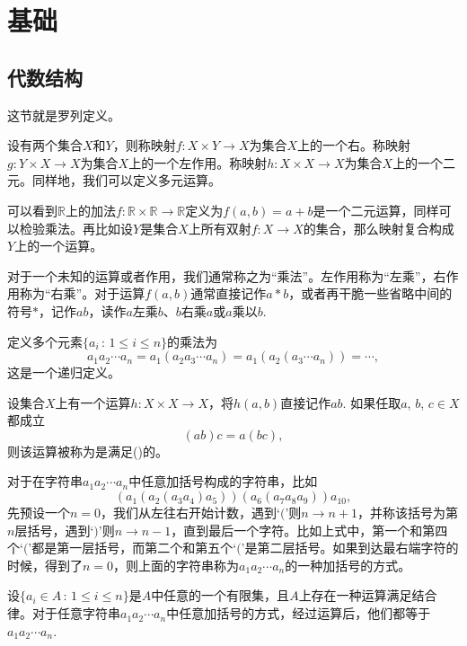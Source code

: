 \chapter{基础}

\section{代数结构}

这节就是罗列定义。

\begin{para}
设有两个集合$X$和$Y$，则称映射$f:X\times Y \to X$为集合$X$上的一个右。称映射$g:Y\times X \to X$为集合$X$上的一个左作用。称映射$h:X\times X \to X$为集合$X$上的一个二元。同样地，我们可以定义多元运算。
\end{para}

可以看到$\mathbb{R}$上的加法$f:\mathbb{R}\times \mathbb{R} \to \mathbb{R}$定义为$f(a,b)=a+b$是一个二元运算，同样可以检验乘法。再比如设$Y$是集合$X$上所有双射$f:X\to X$的集合，那么映射复合构成$Y$上的一个运算。

对于一个未知的运算或者作用，我们通常称之为“乘法”。左作用称为“左乘”，右作用称为“右乘”。对于运算$f(a,b)$通常直接记作$a*b$，或者再干脆一些省略中间的符号$*$，记作$ab$，读作$a$左乘$b$、$b$右乘$a$或$a$乘以$b$.

定义多个元素$\{a_i\,:\, 1\leq i \leq n\}$的乘法为
\[
	a_1a_2\cdots a_n=a_1(a_2a_3\cdots a_n)=a_1(a_2(a_3\cdots a_n))=\cdots,
\]
这是一个递归定义。

\begin{para}
设集合$X$上有一个运算$h:X\times X \to X$，将$h(a,b)$直接记作$ab$. 如果任取$a$, $b$, $c\in X$都成立
\[
	(ab)c=a(bc),
\]
则该运算被称为是满足()的。
\end{para}

对于在字符串$a_1a_2\cdots a_n$中任意加括号构成的字符串，比如
\[
(a_1(a_2(a_3a_4)a_5))(a_6(a_7a_8a_9))a_{10},
\]
先预设一个$n=0$，我们从左往右开始计数，遇到`$($'则$n\to n+1$，并称该括号为第$n$层括号，遇到`$)$'则$n\to n-1$，直到最后一个字符。比如上式中，第一个和第四个`$($'都是第一层括号，而第二个和第五个`$($'是第二层括号。如果到达最右端字符的时候，得到了$n=0$，则上面的字符串称为$a_1a_2\cdots a_n$的一种加括号的方式。

\begin{pro}
设$\{a_i\in A\,:\, 1\leq i\leq n\}$是$A$中任意的一个有限集，且$A$上存在一种运算满足结合律。对于任意字符串$a_1a_2\cdots a_n$中任意加括号的方式，经过运算后，他们都等于$a_1a_2\cdots a_n$.
\end{pro}


